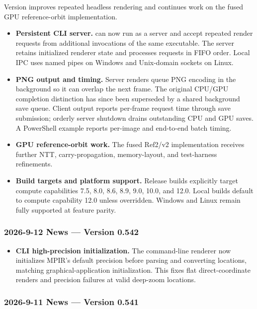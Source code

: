 Version  improves repeated headless rendering and continues work on
the fused GPU reference-orbit implementation.

\begin{itemize}
\item \textbf{Persistent CLI server.}  can now run as a
  server and accept repeated render requests from additional invocations of the
  same executable. The server retains initialized renderer state and processes
  requests in FIFO order. Local IPC uses named pipes on Windows and Unix-domain
  sockets on Linux.

\item \textbf{PNG output and timing.} Server renders queue PNG encoding in the
  background so it can overlap the next frame. The original CPU/GPU completion
  distinction has since been superseded by a shared background save queue.
  Client output reports per-frame request time through save submission;
  orderly server shutdown drains outstanding CPU and GPU saves. A PowerShell
  example reports per-image and end-to-end batch timing.

\item \textbf{GPU reference-orbit work.} The fused Ref2/v2 implementation
  receives further NTT, carry-propagation, memory-layout, and test-harness
  refinements.

\item \textbf{Build targets and platform support.} Release builds explicitly
  target compute capabilities 7.5, 8.0, 8.6, 8.9, 9.0, 10.0, and 12.0. Local
  builds default to compute capability 12.0 unless overridden. Windows and
  Linux remain fully supported at feature parity.
\end{itemize}

\subsubsection{2026-9-12 News --- Version 0.542}

\begin{itemize}
\item \textbf{CLI high-precision initialization.} The command-line renderer now
  initializes MPIR's default precision before parsing and converting locations,
  matching graphical-application initialization. This fixes flat direct-coordinate
  renders and precision failures at valid deep-zoom locations.
\end{itemize}

\subsubsection{2026-9-11 News --- Version 0.541}

